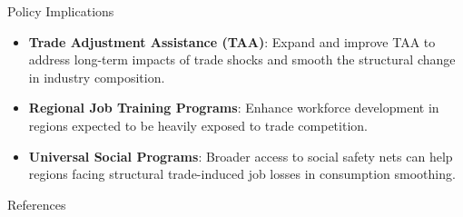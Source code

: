 \documentclass{beamer}
\begin{document}
\begin{frame}{Policy Implications}
    \begin{itemize}
        \item \textbf{Trade Adjustment Assistance (TAA)}: Expand and improve TAA to address long-term impacts of trade shocks and smooth the structural change in industry composition.
        \item \textbf{Regional Job Training Programs}: Enhance workforce development in regions expected to be heavily exposed to trade competition.
        \item \textbf{Universal Social Programs}: Broader access to social safety nets can help regions facing structural trade-induced job losses in consumption smoothing.
    \end{itemize}
\end{frame}

\begin{frame}[allowframebreaks]{References}
    \printbibliography
\end{frame}
\end{document}

